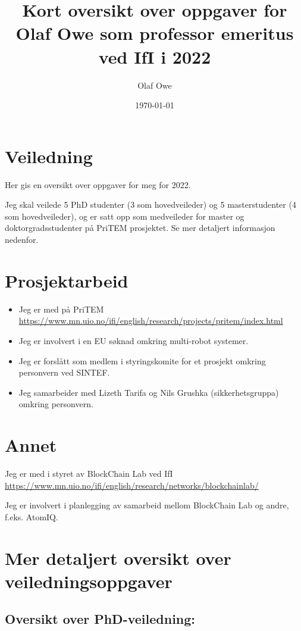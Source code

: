 \documentclass[11pt]{article}
\author{Olaf Owe}
\date{\today}
\title{Kort oversikt over oppgaver for Olaf Owe
som professor  emeritus ved IfI i 2022 }
\begin{document}
\maketitle


\section*{Veiledning}
\label{sec-1}
Her gis en oversikt over oppgaver for meg for 2022.

Jeg skal veilede 5 PhD studenter (3 som hovedveileder)
og 5 masterstudenter  (4 som hovedveileder),
og er satt opp som medveileder for master og doktorgradsstudenter
på PriTEM prosjektet. Se mer detaljert informasjon nedenfor.

\section*{Prosjektarbeid}
\label{sec-2}
\begin{itemize}
\item Jeg er med på PriTEM 
\url{https://www.mn.uio.no/ifi/english/research/projects/pritem/index.html}

\item %
Jeg er involvert i en EU søknad omkring multi-robot systemer.

\item %
Jeg er forslått som medlem i styringskomite for et prosjekt omkring
personvern ved SINTEF.
\item
  Jeg samarbeider med Lizeth Tarifa og Nils Grushka (sikkerhetsgruppa)
  omkring personvern. %
\end{itemize}
\section*{Annet}
\label{sec-3}
Jeg er med i styret av BlockChain Lab ved IfI
\url{https://www.mn.uio.no/ifi/english/research/networks/blockchainlab/}

\noindent 
Jeg er involvert i planlegging av  samarbeid mellom BlockChain Lab
og andre, f.eks.  AtomIQ.



\section*{Mer detaljert oversikt over veiledningsoppgaver}
\label{sec-4}
\subsection*{Oversikt over PhD-veiledning:}
\label{sec-4-1}
\end{document}
